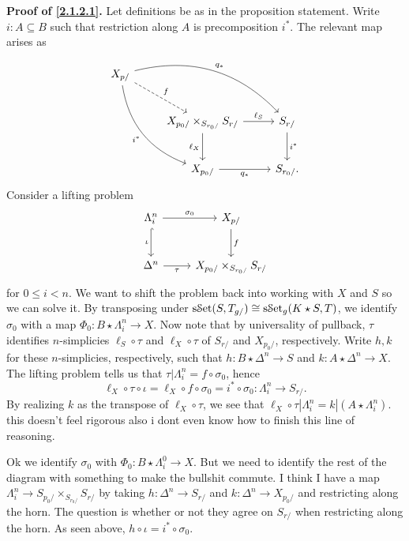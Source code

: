\noindent\textbf{Proof of \cref{2.1.2.1}.} Let definitions be as in the proposition statement. Write $i : A \subseteq B$ such that restriction along $A$ is precomposition $i^*$. The relevant map arises as
\[\begin{tikzcd}[row sep = 2.5em, column sep = 2.5em]
X_{p/} \ar[" q_* ", bend left, drr] \ar[" i^* "', bend right, ddr] \ar[" f ", dashed, dr]  &  &  \\
 & X_{p_0/} \times _{S_{r_0/} } S_{r/}\ar[" \ell_S ", r] \ar[" \ell _X "', d]   & S_{r/} \ar[" i^* ", d]  \\
 & X_{p_0/} \ar[" q_* "', r]  & S_{r_0/} .
\end{tikzcd}\]
Consider a lifting problem
\[\begin{tikzcd}[row sep = 2.5em, column sep = 2.5em]
\Lambda _i^n \ar[" \sigma _0 ", r] \ar[" \iota  "', hook, d]  & X_{p/} \ar[" f ", d]  \\
\Delta ^n \ar[" \tau  "', r]  & X_{p_0/} \times _{S_{r_0/} } S_{r/} 
\end{tikzcd}\]
for $0\leq i<n$. We want to shift the problem back into working with $X$ and $S$ so we can solve it. By transposing under $\mathrm{s}\mathcal{S}\mathrm{et} (S,T_{g/} )\cong \mathrm{s}\mathcal{S}\mathrm{et}_g(K \star S,T)$, we identify $\sigma _0$ with a map $\Phi _0 : B \star \Lambda _i^n \to X$. Now note that by universality of pullback, $\tau $ identifies $n$-simplicies $\ell _S \circ \tau $ and $\ell _X \circ \tau $ of $S_{r/} $ and $X_{p_0/} $, respectively. Write $h,k$ for these $n$-simplicies, respectively, such that $h : B \star \Delta ^n \to S$ and $k : A \star \Delta ^n \to X$. The lifting problem tells us that $\tau |\Lambda _i^n = f\circ \sigma _0$, hence
\[
	\ell _X \circ \tau \circ \iota =\ell _X \circ f \circ \sigma _0 = i^* \circ \sigma _0 : \Lambda _i^n \to S_{r/}
.\]
By realizing $k$ as the transpose of $\ell_X \circ \tau $, we see that $\ell _X \circ \tau |\Lambda _i^n = k|(A \star \Lambda _i^n)$. this doesn't feel rigorous also i dont even know how to finish this line of reasoning.


Ok we identify $\sigma _0$ with $\Phi _0 : B\star \Lambda _i^0 \to X$. But we need to identify the rest of the diagram with something to make the bullshit commute. I think I have a map $\Lambda _i^n\to S_{p_0/} \times _{S_{r_0/} } S_{r/} $ by taking $h : \Delta ^n \to S_{r/} $ and $k : \Delta ^n \to X_{p_0/} $ and restricting along the horn. The question is whether or not they agree on $S_{r/} $ when restricting along the horn. As seen above,  $h \circ \iota =i^*\circ \sigma _0$.

